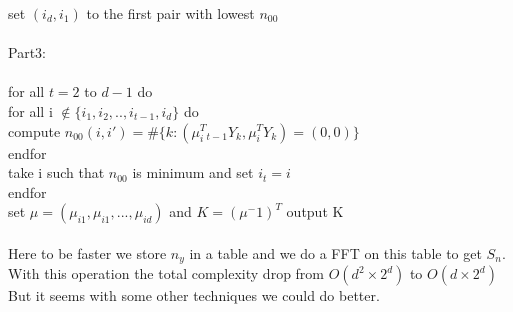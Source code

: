 \documentclass{article}
\begin{document}
set $(i_d,i_1)$ to the first pair with lowest $n_{00}$\\
\\
Part3:\\
\\
for all $t=2$ to $d-1$ do\\
for all i $\notin \{i_1,i_2,..,i_{t-1},i_d\}$ do\\
compute $n_{00}(i,i')=\#\{k:(\mu^{T}_i_{t-1}Y_k,\mu^{T}_iY_k)=(0,0)\}$\\
endfor\\
take i such that $n_{00}$ is minimum and set $i_t=i$\\
endfor\\
set $\mu = (\mu_{i1},\mu_{i1},...,\mu_{id})$ and $K=(\mu^-1)^T$
output K\\
\\
Here to be faster we store $n_y$ in a table and we do a FFT on this table to get $S_n$. With this operation the total complexity drop from $O(d^2 \times 2^d)$ to $O(d \times 2^d)$
But it seems with some other techniques we could do better.
\end{document}

